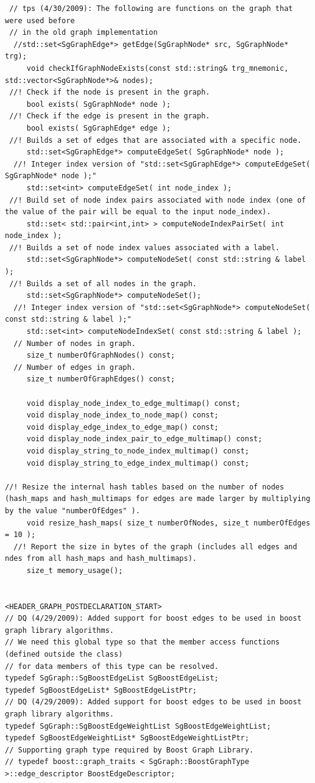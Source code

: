 \begin{enumerate}
\begin{lstlisting}
 // tps (4/30/2009): The following are functions on the graph that were used before 
 // in the old graph implementation
  //std::set<SgGraphEdge*> getEdge(SgGraphNode* src, SgGraphNode* trg);
     void checkIfGraphNodeExists(const std::string& trg_mnemonic, std::vector<SgGraphNode*>& nodes);
 //! Check if the node is present in the graph.
     bool exists( SgGraphNode* node );
 //! Check if the edge is present in the graph.
     bool exists( SgGraphEdge* edge );
 //! Builds a set of edges that are associated with a specific node.
     std::set<SgGraphEdge*> computeEdgeSet( SgGraphNode* node );
  //! Integer index version of "std::set<SgGraphEdge*> computeEdgeSet( SgGraphNode* node );"
     std::set<int> computeEdgeSet( int node_index );
 //! Build set of node index pairs associated with node index (one of the value of the pair will be equal to the input node_index).
     std::set< std::pair<int,int> > computeNodeIndexPairSet( int node_index );
 //! Builds a set of node index values associated with a label.
     std::set<SgGraphNode*> computeNodeSet( const std::string & label );
 //! Builds a set of all nodes in the graph.
     std::set<SgGraphNode*> computeNodeSet();
  //! Integer index version of "std::set<SgGraphNode*> computeNodeSet( const std::string & label );"
     std::set<int> computeNodeIndexSet( const std::string & label );
  // Number of nodes in graph.
     size_t numberOfGraphNodes() const;
  // Number of edges in graph.
     size_t numberOfGraphEdges() const;

     void display_node_index_to_edge_multimap() const;
     void display_node_index_to_node_map() const;
     void display_edge_index_to_edge_map() const;
     void display_node_index_pair_to_edge_multimap() const;
     void display_string_to_node_index_multimap() const;
     void display_string_to_edge_index_multimap() const;

//! Resize the internal hash tables based on the number of nodes (hash_maps and hash_multimaps for edges are made larger by multiplying by the value "numberOfEdges" ).
     void resize_hash_maps( size_t numberOfNodes, size_t numberOfEdges = 10 );
  //! Report the size in bytes of the graph (includes all edges and ndes from all hash_maps and hash_multimaps).
     size_t memory_usage();


<HEADER_GRAPH_POSTDECLARATION_START>
// DQ (4/29/2009): Added support for boost edges to be used in boost graph library algorithms.
// We need this global type so that the member access functions (defined outside the class)
// for data members of this type can be resolved.
typedef SgGraph::SgBoostEdgeList SgBoostEdgeList;
typedef SgBoostEdgeList* SgBoostEdgeListPtr;
// DQ (4/29/2009): Added support for boost edges to be used in boost graph library algorithms.
typedef SgGraph::SgBoostEdgeWeightList SgBoostEdgeWeightList;
typedef SgBoostEdgeWeightList* SgBoostEdgeWeightListPtr;
// Supporting graph type required by Boost Graph Library.
// typedef boost::graph_traits < SgGraph::BoostGraphType >::edge_descriptor BoostEdgeDescriptor;



\end{lstlisting}
\end{enumerate}
